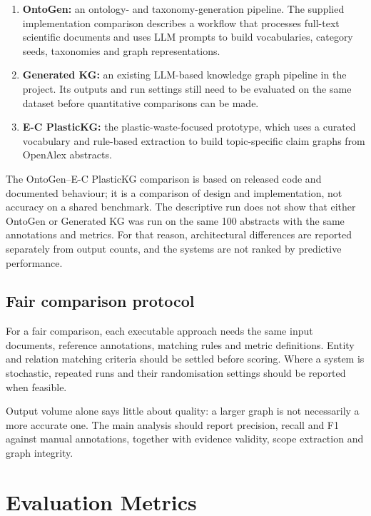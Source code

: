 \documentclass[11pt,a4paper]{article}
\begin{document}
\begin{enumerate}[leftmargin=*]
  \item \textbf{OntoGen:} an ontology- and taxonomy-generation pipeline. The supplied implementation comparison describes a workflow that processes full-text scientific documents and uses LLM prompts to build vocabularies, category seeds, taxonomies and graph representations.
  \item \textbf{Generated KG:} an existing LLM-based knowledge graph pipeline in the project. Its outputs and run settings still need to be evaluated on the same dataset before quantitative comparisons can be made.
  \item \textbf{E-C PlasticKG:} the plastic-waste-focused prototype, which uses a curated vocabulary and rule-based extraction to build topic-specific claim graphs from OpenAlex abstracts.
\end{enumerate}

The OntoGen--E-C PlasticKG comparison is based on released code and documented behaviour; it is a comparison of design and implementation, not accuracy on a shared benchmark. The descriptive run does not show that either OntoGen or Generated KG was run on the same 100 abstracts with the same annotations and metrics. For that reason, architectural differences are reported separately from output counts, and the systems are not ranked by predictive performance.

\subsection{Fair comparison protocol}

For a fair comparison, each executable approach needs the same input documents, reference annotations, matching rules and metric definitions. Entity and relation matching criteria should be settled before scoring. Where a system is stochastic, repeated runs and their randomisation settings should be reported when feasible.

Output volume alone says little about quality: a larger graph is not necessarily a more accurate one. The main analysis should report precision, recall and F1 against manual annotations, together with evidence validity, scope extraction and graph integrity.

\section{Evaluation Metrics}
\end{document}
